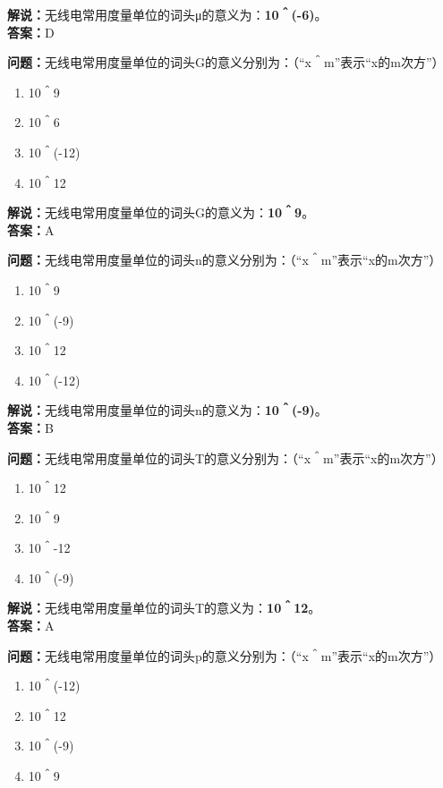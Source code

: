 \textbf{解说：}无线电常用度量单位的词头μ的意义为：\textbf{10＾(-6)}。\\\textbf{答案：}D



\textbf{问题：}无线电常用度量单位的词头G的意义分别为：（“x＾m”表示“x的m次方”）

\begin{enumerate}[label=\Alph*), leftmargin=1.5cm]
	\item 10＾9
	\item 10＾6
	\item 10＾(-12)
	\item 10＾12
\end{enumerate}

\textbf{解说：}无线电常用度量单位的词头G的意义为：\textbf{10＾9}。\\\textbf{答案：}A



\textbf{问题：}无线电常用度量单位的词头n的意义分别为：（“x＾m”表示“x的m次方”）

\begin{enumerate}[label=\Alph*), leftmargin=1.5cm]
	\item 10＾9
	\item 10＾(-9)
	\item 10＾12
	\item 10＾(-12)
\end{enumerate}

\textbf{解说：}无线电常用度量单位的词头n的意义为：\textbf{10＾(-9)}。\\\textbf{答案：}B



\textbf{问题：}无线电常用度量单位的词头T的意义分别为：（“x＾m”表示“x的m次方”）

\begin{enumerate}[label=\Alph*), leftmargin=1.5cm]
	\item 10＾12
	\item 10＾9
	\item 10＾-12
	\item 10＾(-9)
\end{enumerate}

\textbf{解说：}无线电常用度量单位的词头T的意义为：\textbf{10＾12}。\\\textbf{答案：}A



\textbf{问题：}无线电常用度量单位的词头p的意义分别为：（“x＾m”表示“x的m次方”）

\begin{enumerate}[label=\Alph*), leftmargin=1.5cm]
	\item 10＾(-12)
	\item 10＾12
	\item 10＾(-9)
	\item 10＾9
\end{enumerate}

